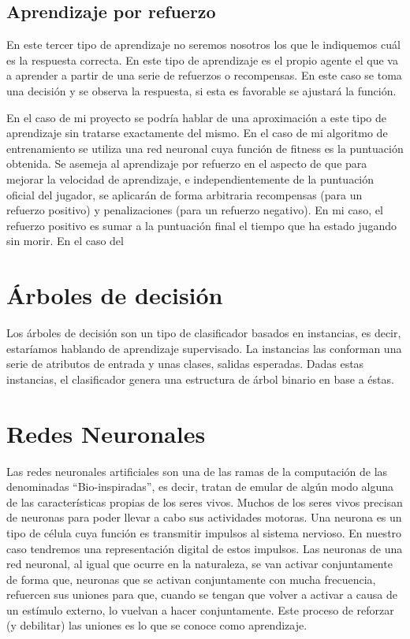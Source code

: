 \subsection{Aprendizaje por refuerzo}

En este tercer tipo de aprendizaje no seremos nosotros los que le indiquemos cuál es la respuesta correcta. En este tipo de aprendizaje es el propio agente el que va a aprender a partir de una serie de refuerzos o recompensas. En este caso se toma una decisión y se observa la respuesta, si esta es favorable se ajustará la función. 

En el caso de mi proyecto se podría hablar de una aproximación a este tipo de aprendizaje sin tratarse exactamente del mismo. En el caso de mi algoritmo de entrenamiento se utiliza una red neuronal cuya función de fitness es la puntuación obtenida. Se asemeja al aprendizaje por refuerzo en el aspecto de que para mejorar la velocidad de aprendizaje, e independientemente de la puntuación oficial del jugador, se aplicarán de forma arbitraria recompensas (para un refuerzo positivo) y penalizaciones (para un refuerzo negativo). En mi caso, el refuerzo positivo es sumar a la puntuación final el tiempo que ha estado jugando sin morir. En el caso del


\section{Árboles de decisión}
Los árboles de decisión son un tipo de clasificador basados en instancias, es decir, estaríamos hablando de aprendizaje supervisado. La instancias las conforman una serie de atributos de entrada y unas clases, salidas esperadas. Dadas estas instancias, el clasificador genera una estructura de árbol binario en base a éstas.





\section{Redes Neuronales}
Las redes neuronales artificiales son una de las ramas de la computación de las denominadas ``Bio-inspiradas'', es decir, tratan de emular de algún modo alguna de las características propias de los seres vivos. Muchos de los seres vivos precisan de neuronas para poder llevar a cabo sus actividades motoras. \cite{wiki:neurona} Una neurona es un tipo de célula cuya función es transmitir impulsos al sistema nervioso. En nuestro caso tendremos una representación digital de estos impulsos. Las neuronas de una red neuronal, al igual que ocurre en la naturaleza, se van activar conjuntamente  de forma que, neuronas que se activan conjuntamente con mucha frecuencia, refuercen sus uniones para que, cuando se tengan que volver a activar a causa de un estímulo externo, lo vuelvan a hacer conjuntamente. Este proceso de reforzar (y debilitar) las uniones es lo que se conoce como aprendizaje.


